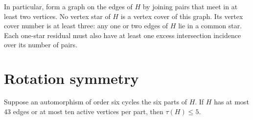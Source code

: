 In particular, form a graph on the edges of $H$ by joining pairs that
meet in at least two vertices. No vertex star of $H$ is a vertex cover
of this graph. Its vertex cover number is at least three: any one or
two edges of $H$ lie in a common star. Each one-star residual must
also have at least one excess intersection incidence over its number
of pairs.

\section{Rotation symmetry}

\begin{proposition}
Suppose an automorphism of order six cycles the six parts of $H$.
If $H$ has at most 43 edges or at most ten active vertices per part,
then $\tau(H)\le5$.
\end{proposition}

